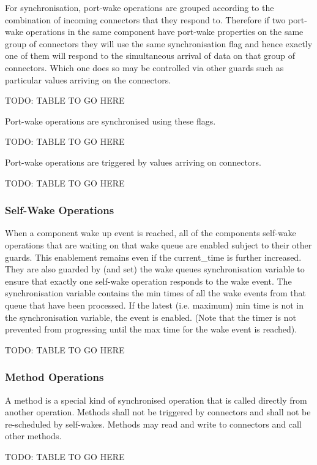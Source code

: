 For synchronisation, port-wake operations are grouped according to the combination of incoming connectors that they respond to. Therefore if two port-wake operations in the same component have port-wake properties on the same group of connectors they will use the same synchronisation flag and hence exactly one of them will respond to the simultaneous arrival of data on that group of connectors.  Which one does so may be controlled via other guards such as particular values arriving on the connectors.

TODO: TABLE TO GO HERE


Port-wake operations are synchronised using these flags.

TODO: TABLE TO GO HERE


Port-wake operations are triggered by values arriving on connectors.

TODO: TABLE TO GO HERE


\subsubsection{Self-Wake Operations}

When a component wake up event is reached, all of the components self-wake operations that are waiting on that wake queue are enabled subject to their other guards. This enablement remains even if the current\_time is further increased. They are also guarded by (and set) the wake queues synchronisation variable to ensure that exactly one self-wake operation responds to the wake event. The synchronisation variable contains the min times of all the wake events from that queue that have been processed. If the latest (i.e. maximum) min time is not in the synchronisation variable, the event is enabled. (Note that the timer is not prevented from progressing until the max time for the wake event is reached).

TODO: TABLE TO GO HERE

\subsubsection{Method Operations}

A method is a special kind of synchronised operation that is called directly from another operation. Methods shall not be triggered by connectors and shall not be re-scheduled by self-wakes. Methods may read and write to connectors and call other methods. 

TODO: TABLE TO GO HERE

